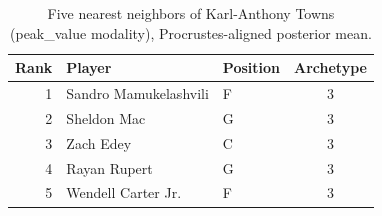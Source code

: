 \begin{table}[htbp]
  \centering\small
  \begin{tabular}{rllc}
    \toprule
    Rank & Player & Position & Archetype \\
    \midrule
    1 & Sandro Mamukelashvili & F & 3 \\
    2 & Sheldon Mac & G & 3 \\
    3 & Zach Edey & C & 3 \\
    4 & Rayan Rupert & G & 3 \\
    5 & Wendell Carter Jr. & F & 3 \\
    \bottomrule
  \end{tabular}
  \caption{Five nearest neighbors of Karl-Anthony Towns (peak_value modality), Procrustes-aligned posterior mean.}
  \label{tab:Karl_Anthony_Towns_neighbors_peak_value}
\end{table}

